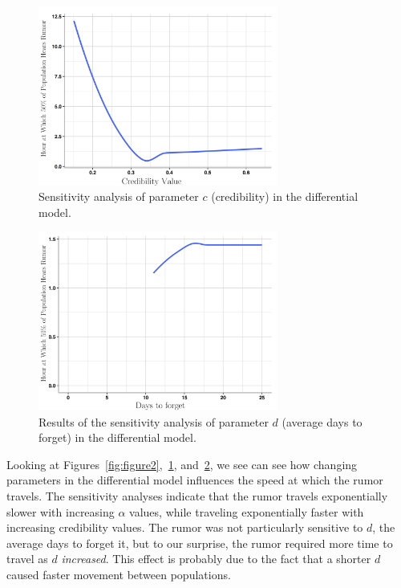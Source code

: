 \begin{figure}[H]
\captionsetup{width=0.8\textwidth}
\centering
    \includegraphics[width=0.7\textwidth]{figures/figure3}
  \caption{Sensitivity analysis of parameter $ c $ (credibility) in the differential model.}
\label{fig:figure3}
\end{figure}

\begin{figure}[H]
\captionsetup{width=0.8\textwidth}
\centering
    \includegraphics[width=0.7\textwidth]{figures/figure4}
  \caption{Results of the sensitivity analysis of parameter $ d $ (average days to forget) in the differential model.}
\label{fig:figure4}
\end{figure}

Looking at Figures~\ref{fig:figure2},~\ref{fig:figure3}, and~\ref{fig:figure4}, we see can see how changing parameters in the differential model influences the speed at which the rumor travels.
The sensitivity analyses indicate that the rumor travels exponentially slower with increasing $ \alpha $ values, while traveling exponentially faster with increasing credibility values.
The rumor was not particularly sensitive to $ d $, the average days to forget it, but to our surprise, the rumor required more time to travel as $ d $ \textit{increased}.
This effect is probably due to the fact that a shorter $ d $ caused faster movement between populations.

